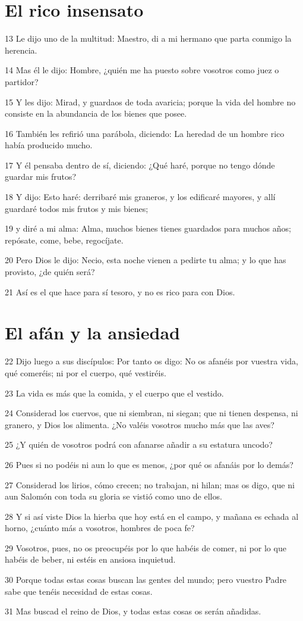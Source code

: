 \section*{El rico insensato}

\par 13 Le dijo uno de la multitud: Maestro, di a mi hermano que parta conmigo la herencia.
\par 14 Mas él le dijo: Hombre, ¿quién me ha puesto sobre vosotros como juez o partidor?
\par 15 Y les dijo: Mirad, y guardaos de toda avaricia; porque la vida del hombre no consiste en la abundancia de los bienes que posee.
\par 16 También les refirió una parábola, diciendo: La heredad de un hombre rico había producido mucho.
\par 17 Y él pensaba dentro de sí, diciendo: ¿Qué haré, porque no tengo dónde guardar mis frutos?
\par 18 Y dijo: Esto haré: derribaré mis graneros, y los edificaré mayores, y allí guardaré todos mis frutos y mis bienes;
\par 19 y diré a mi alma: Alma, muchos bienes tienes guardados para muchos años; repósate, come, bebe, regocíjate.
\par 20 Pero Dios le dijo: Necio, esta noche vienen a pedirte tu alma; y lo que has provisto, ¿de quién será?
\par 21 Así es el que hace para sí tesoro, y no es rico para con Dios.

\section*{El afán y la ansiedad}

\par 22 Dijo luego a sus discípulos: Por tanto os digo: No os afanéis por vuestra vida, qué comeréis; ni por el cuerpo, qué vestiréis.
\par 23 La vida es más que la comida, y el cuerpo que el vestido.
\par 24 Considerad los cuervos, que ni siembran, ni siegan; que ni tienen despensa, ni granero, y Dios los alimenta. ¿No valéis vosotros mucho más que las aves?
\par 25 ¿Y quién de vosotros podrá con afanarse añadir a su estatura uncodo?
\par 26 Pues si no podéis ni aun lo que es menos, ¿por qué os afanáis por lo demás?
\par 27 Considerad los lirios, cómo crecen; no trabajan, ni hilan; mas os digo, que ni aun Salomón con toda su gloria se vistió como uno de ellos.
\par 28 Y si así viste Dios la hierba que hoy está en el campo, y mañana es echada al horno, ¿cuánto más a vosotros, hombres de poca fe?
\par 29 Vosotros, pues, no os preocupéis por lo que habéis de comer, ni por lo que habéis de beber, ni estéis en ansiosa inquietud.
\par 30 Porque todas estas cosas buscan las gentes del mundo; pero vuestro Padre sabe que tenéis necesidad de estas cosas.
\par 31 Mas buscad el reino de Dios, y todas estas cosas os serán añadidas.

